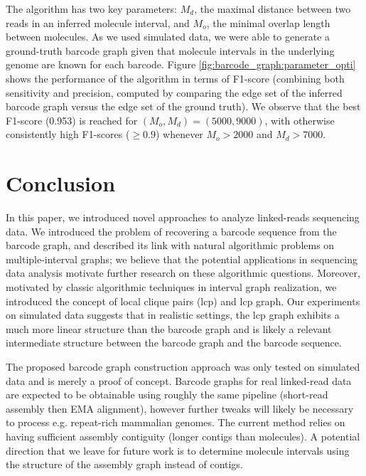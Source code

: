 \documentclass[a4paper,UKenglish,cleveref, autoref, thm-restate,authorcolumns]{lipics-v2019}
\begin{document}
The algorithm has two key parameters: $M_d$, the maximal distance between two reads in an inferred molecule interval, and $M_o$, the minimal overlap length between molecules. As we used simulated data, we were able to generate a ground-truth barcode graph given that molecule intervals in the underlying genome are known for each barcode. Figure \ref{fig:barcode_graph:parameter_opti} shows the performance of the algorithm in terms of F1-score (combining both sensitivity and precision, computed by comparing the edge set of the inferred barcode graph versus the edge set of the ground truth). We observe that the best F1-score (0.953) is reached for $(M_o, M_d) = (5000, 9000)$, with otherwise consistently high F1-scores ($\geq0.9$) whenever $M_o>2000$ and $M_d>7000$.




\section{Conclusion}

In this paper, we introduced novel approaches to analyze linked-reads sequencing data. 
We introduced the problem of recovering a barcode sequence from the barcode graph, and described its link with natural algorithmic problems on multiple-interval graphs; we believe that the potential applications in sequencing data analysis motivate further research on these algorithmic questions.
Moreover, motivated by classic algorithmic techniques in interval graph realization, we introduced the concept of local clique pairs (lcp) and lcp graph.
Our experiments on simulated data suggests that in realistic settings, the lcp graph exhibits a much more linear structure than the barcode graph and is likely a relevant intermediate structure between the barcode graph and the barcode sequence.

The proposed barcode graph construction approach was only tested on simulated data and is merely a proof of concept. Barcode graphs for real linked-read data are expected to be obtainable using roughly the same pipeline (short-read assembly then EMA alignment), however further tweaks will likely be necessary to process e.g. repeat-rich mammalian genomes. The current method relies on having sufficient assembly contiguity (longer contigs than molecules). A potential direction that we leave for future work is to determine molecule intervals using the structure of the assembly graph instead of contigs.



\vfill\pagebreak

\end{document}
